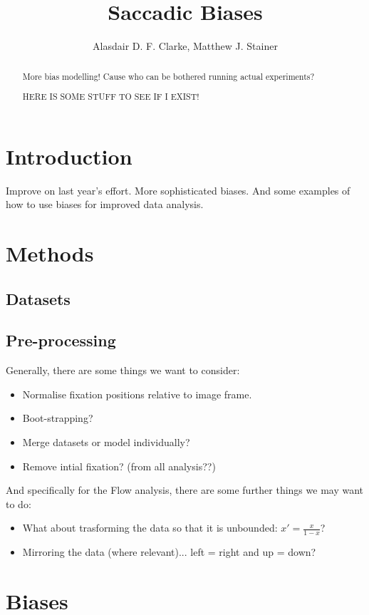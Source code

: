 \documentclass[a4paper, onecolumn, oneside, 11pt]{article}
\title{Saccadic Biases}
\author{Alasdair D. F. Clarke, Matthew J. Stainer}
\begin{document}
\maketitle

\begin{abstract}
More bias modelling! Cause who can be bothered running actual experiments?

HERE IS SOME STUFF TO SEE IF I EXIST!
\end{abstract}


\section{Introduction}

Improve on last year's \citep{clarke-tatler2014} effort. More sophisticated biases. And some examples of how to use biases for improved data analysis. 

\section{Methods}

\subsection{Datasets}

\subsection{Pre-processing}
Generally, there are some things we want to consider:
\begin{itemize}
\item Normalise fixation positions relative to image frame. 
\item Boot-strapping? 
\item Merge datasets or model individually? 
\item Remove intial fixation? (from all analysis??)
\end{itemize} 

And specifically for the Flow analysis, there are some further things we may want to do:
\begin{itemize}
\item What about trasforming the data so that it is unbounded: $x'=\frac{x}{1-x}$?
\item Mirroring the data (where relevant)... left = right and up = down?
\end{itemize} 

\section{Biases}
\end{document}
